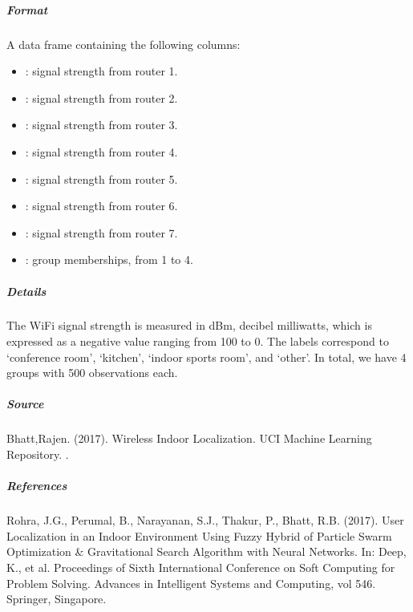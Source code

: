 \documentclass[letterpaper,10pt,english,openany,oneside]{sphinxmanual}
\begin{document}
\subparagraph{Format}
\label{\detokenize{user_guide/datasets:format}}
\sphinxAtStartPar
A data frame containing the following columns:
\begin{itemize}
\item {} 
\sphinxAtStartPar
{}: signal strength from router 1.

\item {} 
\sphinxAtStartPar
{}: signal strength from router 2.

\item {} 
\sphinxAtStartPar
{}: signal strength from router 3.

\item {} 
\sphinxAtStartPar
{}: signal strength from router 4.

\item {} 
\sphinxAtStartPar
{}: signal strength from router 5.

\item {} 
\sphinxAtStartPar
{}: signal strength from router 6.

\item {} 
\sphinxAtStartPar
{}: signal strength from router 7.

\item {} 
\sphinxAtStartPar
{}: group memberships, from 1 to 4.

\end{itemize}


\subparagraph{Details}
\label{\detokenize{user_guide/datasets:details}}
\sphinxAtStartPar
The Wi\sphinxhyphen{}Fi signal strength is measured in dBm, decibel milliwatts, which is expressed
as a negative value ranging from \sphinxhyphen{}100 to 0. The labels correspond to ‘conference room’,
‘kitchen’, ‘indoor sports room’, and ‘other’. In total, we have 4 groups with 500 observations each.


\subparagraph{Source}
\label{\detokenize{user_guide/datasets:source}}
\sphinxAtStartPar
Bhatt,Rajen. (2017). Wireless Indoor Localization. UCI Machine Learning Repository. .


\subparagraph{References}
\label{\detokenize{user_guide/datasets:references}}
\sphinxAtStartPar
Rohra, J.G., Perumal, B., Narayanan, S.J., Thakur, P., Bhatt, R.B. (2017). User Localization in an Indoor Environment Using Fuzzy Hybrid of Particle Swarm Optimization \& Gravitational Search Algorithm with Neural Networks. In: Deep, K., et al. Proceedings of Sixth International Conference on Soft Computing for Problem Solving. Advances in Intelligent Systems and Computing, vol 546. Springer, Singapore. 
\end{document}
